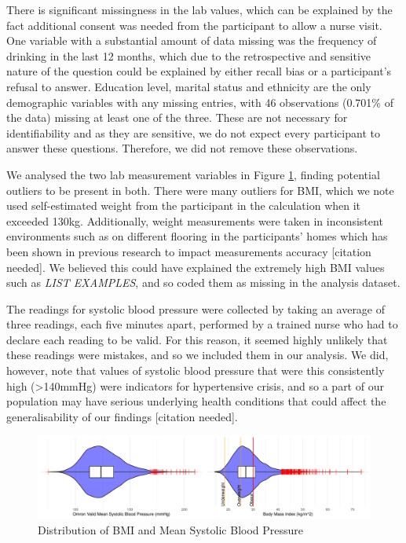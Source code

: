 \documentclass[
  11pt,
  twocolumn]{article}
\begin{document}
There is significant missingness in the lab values, which can be
explained by the fact additional consent was needed from the participant
to allow a nurse visit. One variable with a substantial amount of data
missing was the frequency of drinking in the last 12 months, which due
to the retrospective and sensitive nature of the question could be
explained by either recall bias or a participant's refusal to answer.
Education level, marital status and ethnicity are the only demographic
variables with any missing entries, with 46 observations (0.701\% of the
data) missing at least one of the three. These are not necessary for
identifiability and as they are sensitive, we do not expect every
participant to answer these questions. Therefore, we did not remove
these observations.

We analysed the two lab measurement variables in Figure
\ref{fig:output-distribution-plots}, finding potential outliers to be
present in both. There were many outliers for BMI, which we note used
self-estimated weight from the participant in the calculation when it
exceeded 130kg. Additionally, weight measurements were taken in
inconsistent environments such as on different flooring in the
participants' homes which has been shown in previous research to impact
measurements accuracy {[}citation needed{]}. We believed this could have
explained the extremely high BMI values such as \emph{LIST EXAMPLES},
and so coded them as missing in the analysis dataset.

The readings for systolic blood pressure were collected by taking an
average of three readings, each five minutes apart, performed by a
trained nurse who had to declare each reading to be valid. For this
reason, it seemed highly unlikely that these readings were mistakes, and
so we included them in our analysis. We did, however, note that values
of systolic blood pressure that were this consistently high
(\textgreater140mmHg) were indicators for hypertensive crisis, and so a
part of our population may have serious underlying health conditions
that could affect the generalisability of our findings {[}citation
needed{]}.

\begin{figure}[H]
\includegraphics{Coursework_files/figure-latex/output-distribution-plots-1} \caption{Distribution of BMI and Mean Systolic Blood Pressure}\label{fig:output-distribution-plots}
\end{figure}
\end{document}
